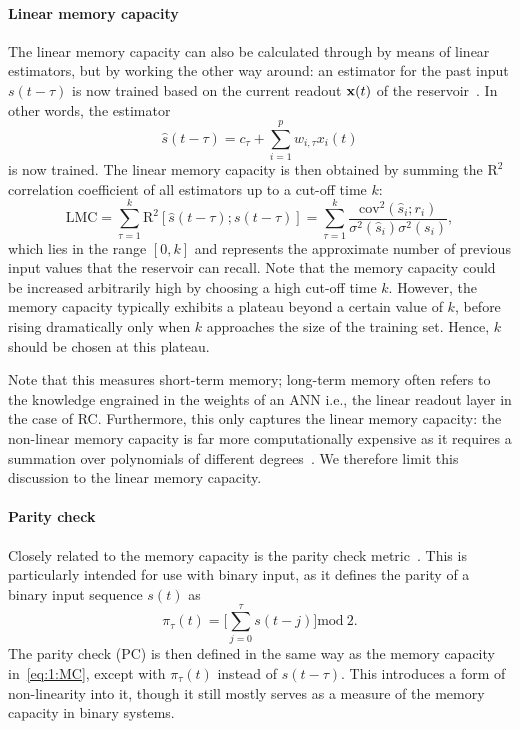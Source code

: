 \paragraph{Linear memory capacity}
The linear memory capacity can also be calculated through by means of linear estimators, but by working the other way around: an estimator for the past input $s(t - \tau)$ is now trained based on the current readout $\boldsymbol{\mathbf{x}}(t)$ of the reservoir~\cite{tsunegi2019STOforcedsyncRC,NeuromorphicFewShot}.
In other words, the estimator
\begin{equation}
	\hat{s}(t - \tau) = c_\tau + \sum_{i=1}^{p} w_{i,\tau} x_i(t)
\end{equation}
is now trained.
The linear memory capacity is then obtained by summing the $\mathrm{R}^2$ correlation coefficient of all estimators up to a cut-off time $k$:
\begin{equation}
	\label{eq:1:MC}
	\mathrm{LMC} = \sum_{\tau = 1}^{k} \mathrm{R}^2[\hat{s}(t - \tau); s(t - \tau)] = \sum_{\tau = 1}^{k} \frac{\mathrm{cov}^2(\hat{s}_i; r_i)}{\sigma^2(\hat{s}_i) \sigma^2(s_i)} \mathrm{,}
\end{equation}
which lies in the range $[0,k]$ and represents the approximate number of previous input values that the reservoir can recall.
Note that the memory capacity could be increased arbitrarily high by choosing a high cut-off time $k$.
However, the memory capacity typically exhibits a plateau beyond a certain value of $k$, before rising dramatically only when $k$ approaches the size of the training set.
Hence, $k$ should be chosen at this plateau. \par
Note that this measures short-term memory; long-term memory often refers to the knowledge engrained in the weights of an ANN i.e., the linear readout layer in the case of RC.
Furthermore, this only captures the linear memory capacity: the non-linear memory capacity is far more computationally expensive as it requires a summation over polynomials of different degrees~\cite{RCbenchmarksReview1}.
We therefore limit this discussion to the linear memory capacity.

\paragraph{Parity check}
Closely related to the memory capacity is the parity check metric~\cite{hon2021numerical,tsunegi2019STOforcedsyncRC}.
This is particularly intended for use with binary input, as it defines the parity of a binary input sequence $s(t)$ as
\begin{equation}
	\pi_\tau(t) = \Bigg[\sum_{j = 0}^{\tau} s(t - j) \Bigg] \mathrm{mod}~2 \mathrm{.}
\end{equation}
The parity check (PC) is then defined in the same way as the memory capacity in~\cref{eq:1:MC}, except with $\pi_\tau(t)$ instead of $s(t - \tau)$.
This introduces a form of non-linearity into it, though it still mostly serves as a measure of the memory capacity in binary systems.

